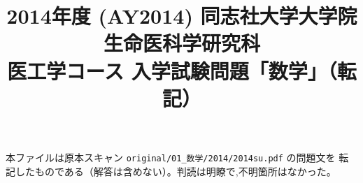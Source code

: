 \documentclass[11pt,a4paper]{article}
\title{2014年度 (AY2014) 同志社大学大学院 生命医科学研究科\\
医工学コース 入学試験問題「数学」（転記）}
\author{}
\date{}
\begin{document}
\maketitle
\vspace{-3em}

\begin{rem}
本ファイルは原本スキャン \texttt{original/01\_数学/2014/2014su.pdf} の問題文を
転記したものである（解答は含めない）。判読は明瞭で,不明箇所はなかった。
\end{rem}

\bigskip

\bigskip

\bigskip

\bigskip

\bigskip

\bigskip

\bigskip

\bigskip

\end{document}
